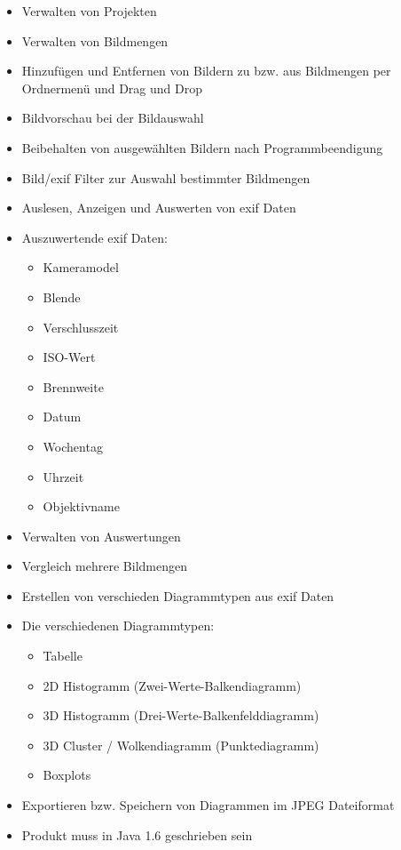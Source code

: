 \begin{itemize}
	\item Verwalten von Projekten
	\item Verwalten von Bildmengen
	\item Hinzufügen und Entfernen von Bildern zu bzw. aus Bildmengen per Ordnermenü und Drag und Drop
	\item Bildvorschau bei der Bildauswahl
	\item Beibehalten von ausgewählten Bildern nach Programmbeendigung
	\item Bild/\gls{exif} Filter zur Auswahl bestimmter Bildmengen
	\item Auslesen, Anzeigen und Auswerten von \gls{exif} Daten
	\item Auszuwertende \gls{exif} Daten:
			\begin{itemize}
			\item Kameramodel
			\item Blende 
			\item Verschlusszeit
			\item ISO-Wert
			\item Brennweite
			\item Datum
			\item Wochentag
			\item Uhrzeit
			\item Objektivname
		\end{itemize}
	\item Verwalten von Auswertungen
	\item Vergleich mehrere Bildmengen
	\item Erstellen von verschieden Diagrammtypen aus \gls{exif} Daten
	\item Die verschiedenen Diagrammtypen:
		\begin{itemize}
		  \item Tabelle
			\item 2D Histogramm (Zwei-Werte-Balkendiagramm)
			\item 3D Histogramm (Drei-Werte-Balkenfelddiagramm)
			\item 3D Cluster / Wolkendiagramm (Punktediagramm)
			\item Boxplots
		\end{itemize}
	\item Exportieren bzw. Speichern von Diagrammen im JPEG Dateiformat
	\item Produkt muss in Java 1.6 geschrieben sein	
\end{itemize}

